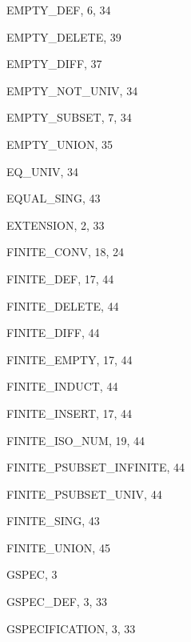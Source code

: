 \begin{theindex}
  \indexspace

  \item {\ptt EMPTY\_DEF}, 6, 34
  \item {\ptt EMPTY\_DELETE}, 39
  \item {\ptt EMPTY\_DIFF}, 37
  \item {\ptt EMPTY\_NOT\_UNIV}, 34
  \item {\ptt EMPTY\_SUBSET}, 7, 34
  \item {\ptt EMPTY\_UNION}, 35
  \item {\ptt EQ\_UNIV}, 34
  \item {\ptt EQUAL\_SING}, 43
  \item {\ptt EXTENSION}, 2, 33

  \indexspace

  \item {\ptt FINITE\_CONV}, 18, 24
  \item {\ptt FINITE\_DEF}, 17, 44
  \item {\ptt FINITE\_DELETE}, 44
  \item {\ptt FINITE\_DIFF}, 44
  \item {\ptt FINITE\_EMPTY}, 17, 44
  \item {\ptt FINITE\_INDUCT}, 44
  \item {\ptt FINITE\_INSERT}, 17, 44
  \item {\ptt FINITE\_ISO\_NUM}, 19, 44
  \item {\ptt FINITE\_PSUBSET\_INFINITE}, 44
  \item {\ptt FINITE\_PSUBSET\_UNIV}, 44
  \item {\ptt FINITE\_SING}, 43
  \item {\ptt FINITE\_UNION}, 45

  \indexspace

  \item {\ptt GSPEC}, 3
  \item {\ptt GSPEC\_DEF}, 3, 33
  \item {\ptt GSPECIFICATION}, 3, 33

  \indexspace


\end{theindex}
